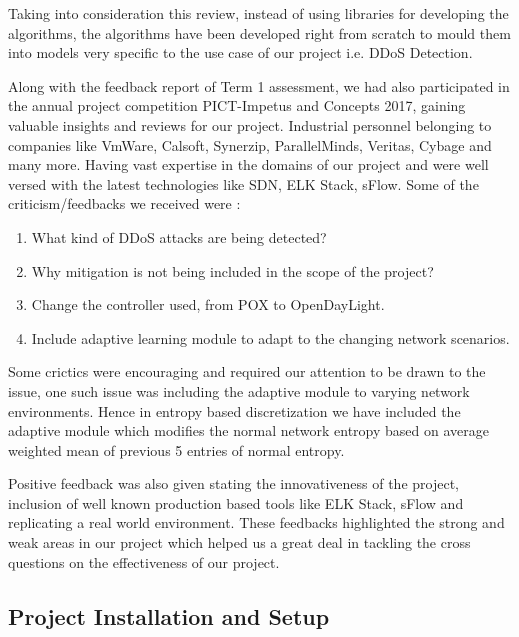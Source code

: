 \documentclass[12pt,a4paper,final]{report}
\DeclareRobustCommand{\gobblefive}[5]{}
\newcommand*{\SkipTocEntry}{\addtocontents{toc}{\gobblefive}}
\begin{document}
{{{{{Taking into consideration this review, instead of using libraries for developing the algorithms, the algorithms have been developed right from scratch to mould them into models very specific to the use case of our project i.e. DDoS Detection.
\newline

Along with the feedback report of Term 1 assessment, we had also participated in the annual project competition PICT-Impetus and Concepts 2017, gaining valuable insights and reviews for our project. Industrial personnel belonging to companies like VmWare, Calsoft, Synerzip, ParallelMinds, Veritas, Cybage and many more. Having vast expertise in the domains of our project and were well versed with the latest technologies like SDN, ELK Stack, sFlow. Some of the criticism/feedbacks we received were :
\begin{enumerate}
\item
What kind of DDoS attacks are being detected?

\item
Why mitigation is not being included in the scope of the project?

\item
Change the controller used, from POX to OpenDayLight.

\item
Include adaptive learning module to adapt to the changing network scenarios. 
\end{enumerate}

Some crictics were encouraging and required our attention to be drawn to the issue, one such issue was including the adaptive module to varying network environments. Hence in entropy based discretization we have included the adaptive module which modifies the normal network entropy based on average weighted mean of previous 5 entries of normal entropy.
\newline

Positive feedback was also given stating the innovativeness of the project, inclusion of well known production based tools like ELK Stack, sFlow and replicating a real world environment. 
\newline
These feedbacks highlighted the strong and weak areas in our project which helped us a great deal in tackling the cross questions on the effectiveness of our project.

\SkipTocEntry\subsection{Project Installation and Setup}

}}}}}
\end{document}
